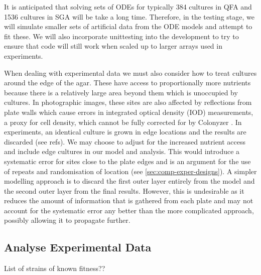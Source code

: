 It is anticipated that solving sets of ODEs for typically 384 cultures
in QFA and 1536 cultures in SGA will be take a long time. Therefore,
in the testing stage, we will simulate smaller sets of artificial data
from the ODE models and attempt to fit these. We will also incorporate
unittesting into the development to try to ensure that code will
still work when scaled up to larger arrays used in experiments.

When dealing with experimental data we must also consider how to treat
cultures around the edge of the agar. These have access to
proportionally more nutrients because there is a relatively large area
beyond them which is unoccupied by cultures. In photographic images,
these sites are also affected by reflections from plate walls which
cause errors in integrated optical density (IOD) measurements, a proxy
for cell density, which cannot be fully corrected for by Colonyzer
\citep{Lawless2010}. In experiments, an identical culture is grown in
edge locations and the results are discarded (see refs). We may choose
to adjust for the increased nutrient access and include edge cultures
in our model and analysis. This would introduce a systematic error for
sites close to the plate edges and is an argument for the use of
repeats and randomisation of location (see
\ref{sec:comp-exper-designs}). A simpler modelling approach is to
discard the first outer layer entirely from the model and the second
outer layer from the final results. However, this is undesirable as it
reduces the amount of information that is gathered from each plate and
may not account for the systematic error any better than the more
complicated approach, possibly allowing it to propagate further.

\subsection{Analyse Experimental Data}
\label{sec:analyse-data}

List of strains of known fitness??

